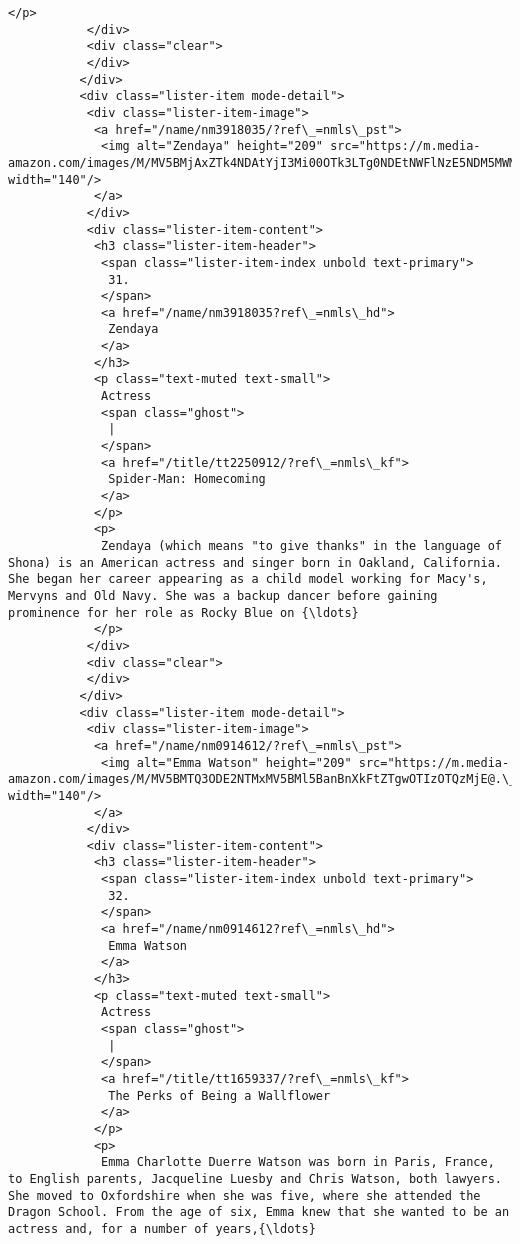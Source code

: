 \documentclass[11pt]{article}
\begin{document}
\begin{Verbatim}[commandchars=\\\{\}]
            </p>
           </div>
           <div class="clear">
           </div>
          </div>
          <div class="lister-item mode-detail">
           <div class="lister-item-image">
            <a href="/name/nm3918035/?ref\_=nmls\_pst">
             <img alt="Zendaya" height="209" src="https://m.media-amazon.com/images/M/MV5BMjAxZTk4NDAtYjI3Mi00OTk3LTg0NDEtNWFlNzE5NDM5MWM1XkEyXkFqcGdeQXVyOTI3MjYwOQ@@.\_V1\_UY209\_CR8,0,140,209\_AL\_.jpg" width="140"/>
            </a>
           </div>
           <div class="lister-item-content">
            <h3 class="lister-item-header">
             <span class="lister-item-index unbold text-primary">
              31.
             </span>
             <a href="/name/nm3918035?ref\_=nmls\_hd">
              Zendaya
             </a>
            </h3>
            <p class="text-muted text-small">
             Actress
             <span class="ghost">
              |
             </span>
             <a href="/title/tt2250912/?ref\_=nmls\_kf">
              Spider-Man: Homecoming
             </a>
            </p>
            <p>
             Zendaya (which means "to give thanks" in the language of Shona) is an American actress and singer born in Oakland, California. She began her career appearing as a child model working for Macy's, Mervyns and Old Navy. She was a backup dancer before gaining prominence for her role as Rocky Blue on {\ldots}
            </p>
           </div>
           <div class="clear">
           </div>
          </div>
          <div class="lister-item mode-detail">
           <div class="lister-item-image">
            <a href="/name/nm0914612/?ref\_=nmls\_pst">
             <img alt="Emma Watson" height="209" src="https://m.media-amazon.com/images/M/MV5BMTQ3ODE2NTMxMV5BMl5BanBnXkFtZTgwOTIzOTQzMjE@.\_V1\_UY209\_CR14,0,140,209\_AL\_.jpg" width="140"/>
            </a>
           </div>
           <div class="lister-item-content">
            <h3 class="lister-item-header">
             <span class="lister-item-index unbold text-primary">
              32.
             </span>
             <a href="/name/nm0914612?ref\_=nmls\_hd">
              Emma Watson
             </a>
            </h3>
            <p class="text-muted text-small">
             Actress
             <span class="ghost">
              |
             </span>
             <a href="/title/tt1659337/?ref\_=nmls\_kf">
              The Perks of Being a Wallflower
             </a>
            </p>
            <p>
             Emma Charlotte Duerre Watson was born in Paris, France, to English parents, Jacqueline Luesby and Chris Watson, both lawyers. She moved to Oxfordshire when she was five, where she attended the Dragon School. From the age of six, Emma knew that she wanted to be an actress and, for a number of years,{\ldots}

\end{Verbatim}
\end{document}
